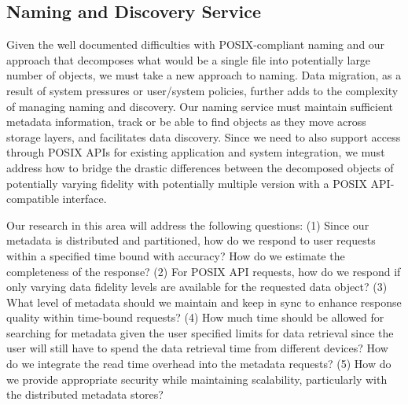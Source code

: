 \subsection{Naming and Discovery Service}

Given the well documented difficulties with POSIX-compliant naming and our
approach that decomposes what would be a single file into potentially large
number of objects, we must take a new approach to naming.  Data migration, as a
result of system pressures or user/system policies, further adds to the
complexity of managing naming and discovery. Our naming service must maintain
sufficient metadata information, track or be able to find objects as they move
across storage layers, and facilitates data discovery. Since we need to also
support access through POSIX APIs for existing application and system
integration, we must address how to bridge the drastic differences between the
decomposed objects of potentially varying fidelity with potentially multiple
version with a POSIX API-compatible interface.

Our research in this area will address the following questions:
(1) Since our metadata is distributed and partitioned, how do we respond to user
  requests within a specified time bound with accuracy? How do we estimate the
  completeness of the response?
(2) For POSIX API requests, how do we respond if only varying data fidelity levels
  are available for the requested data object?
(3) What level of metadata should we maintain and keep in sync to enhance response
  quality within time-bound requests?
(4) How much time should be allowed for searching for metadata given the user
  specified limits for data retrieval since the user will still have to spend
  the data retrieval time from different devices? How do we integrate the read
  time overhead into the metadata requests?
(5) How do we provide appropriate security while maintaining scalability,
  particularly with the distributed metadata stores?

